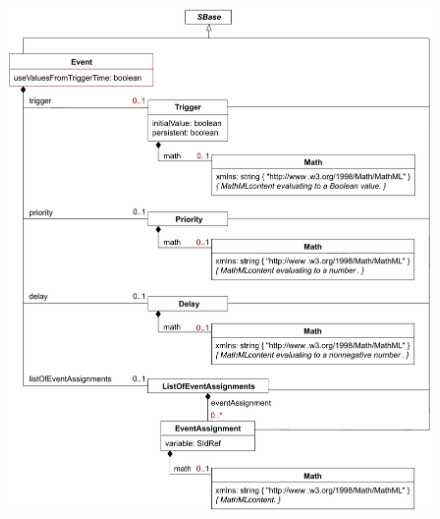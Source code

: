 \begin{figure}[htb]
  \centering
  \small
  \vspace*{-1ex}
             {\includegraphics[scale=0.77]{figs/event-uml}}

\end{figure}
